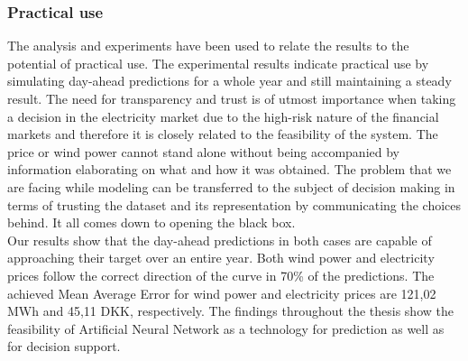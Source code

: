 \subsubsection{Practical use}
The analysis and experiments have been used to relate the results to the potential of practical use. The experimental results indicate practical use by simulating day-ahead predictions for a whole year and still maintaining a steady result. The need for transparency and trust is of utmost importance when taking a decision in the electricity market due to the high-risk nature of the financial markets and therefore it is closely related to the feasibility of the system. The price or wind power cannot stand alone without being accompanied by information elaborating on what and how it was obtained. The problem that we are facing while modeling can be transferred to the subject of decision making in terms of trusting the dataset and its representation by communicating the choices behind. It all comes down to opening the black box.
\\[1cm]
Our results show that the day-ahead predictions in both cases are capable of approaching their target over an entire year. Both wind power and electricity prices follow the correct direction of the curve in 70\% of the predictions. The achieved Mean Average Error for wind power and electricity prices are 121,02 MWh and 45,11 DKK, respectively. The findings throughout the thesis show the feasibility of Artificial Neural Network as a technology for prediction as well as for decision support.